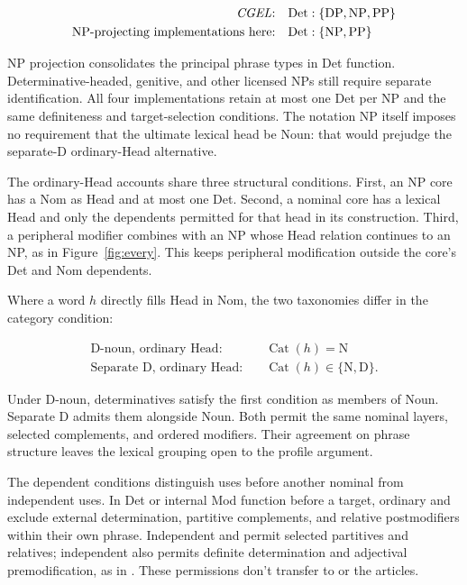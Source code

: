 \documentclass[12pt]{article}
\begin{document}
\[
\begin{aligned}
\text{\textit{CGEL}:} &\quad \mathrm{Det}:\{\mathrm{DP},\mathrm{NP},\mathrm{PP}\} \\
\text{NP-projecting implementations here:} &\quad \mathrm{Det}:\{\mathrm{NP},\mathrm{PP}\}
\end{aligned}
\]

NP projection consolidates the principal phrase types in Det function. Determinative-headed, genitive, and other licensed NPs still require separate identification. All four implementations retain at most one Det per NP and the same definiteness and target-selection conditions. The notation NP itself imposes no requirement that the ultimate lexical head be Noun: that would prejudge the separate-D ordinary-Head alternative.

The ordinary-Head accounts share three structural conditions. First, an NP core has a Nom as Head and at most one Det. Second, a nominal core has a lexical Head and only the dependents permitted for that head in its construction. Third, a peripheral modifier combines with an NP whose Head relation continues to an NP, as in Figure~\ref{fig:every}. This keeps peripheral modification outside the core's Det and Nom dependents.

Where a word $h$ directly fills Head in Nom, the two taxonomies differ in the category condition:

\[
\begin{aligned}
\text{D-noun, ordinary Head:} &\quad \operatorname{Cat}(h)=\mathrm{N} \\
\text{Separate D, ordinary Head:} &\quad \operatorname{Cat}(h)\in\{\mathrm{N},\mathrm{D}\}.
\end{aligned}
\]

Under D-noun, determinatives satisfy the first condition as members of Noun. Separate D admits them alongside Noun. Both permit the same nominal layers, selected complements, and ordered modifiers. Their agreement on phrase structure leaves the lexical grouping open to the profile argument.

The dependent conditions distinguish uses before another nominal from independent uses. In Det or internal Mod function before a target, ordinary  and  exclude external determination, partitive complements, and relative postmodifiers within their own phrase. Independent  and  permit selected partitives and relatives; independent  also permits definite determination and adjectival premodification, as in . These permissions don't transfer to  or the articles.
\end{document}
